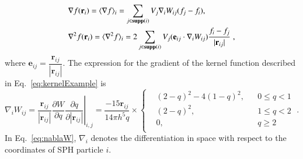 \documentclass[final,3p,times]{elsarticle}
\begin{document}
\begin{align}
&\nabla f(\mathbf r_i)=\langle \nabla f \rangle_i=\sum_{j \in \mathbf{supp}(i)} V_j \nabla_i W_{ij} (f_j-f_i) ,\label{eq:Standard_G}\\
&\nabla^2 f(\mathbf r_i)=\langle \nabla^2 f \rangle_i=2\sum_{j \in \mathbf{supp}(i)} V_j ( \mathbf{e}_{ij} \cdot \nabla_i W_{ij}) \frac{f_i-f_j}{|\mathbf{r}_{ij}|} \label{eq:Standard_L} \; ,
\end{align}
where $\mathbf{e}_{ij}=\dfrac{\mathbf{r}_{ij}}{|\mathbf{r}_{ij}|}$. The expression for the gradient of the kernel function described in Eq.~\eqref{eq:kernelExample}  is 
\begin{equation}
\label{eq:nablaW}
\nabla_i W_{ij} =\left.\frac{\mathbf r_{ij}}{|\mathbf r_{ij}|} \frac{\partial W}{\partial q} \frac{\partial q}{\partial |\mathbf r_{ij}|}\right\vert_{i,j} =  \frac{-15{\mathbf r}_{ij}}{{14\pi {h^5}q}} \times \left\{ \begin{aligned}
&{(2 - q)^2} - 4{(1 - q)^2}, && 0 \le q < 1 \\ 
&(2 - q)^2, && 1 \le q < 2 \\ 
&0, && q \ge 2 \\ 
\end{aligned} \right.\; .
\end{equation}
In Eq.~\eqref{eq:nablaW}, $\nabla_i$ denotes the differentiation in space with respect to the coordinates of SPH particle $i$. 
\end{document}
